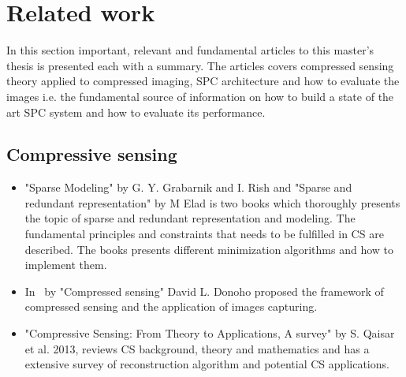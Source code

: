 \section{Related work}
\label{sec:related_work}
In this section important, relevant and fundamental articles to this master's thesis is presented each with a summary. The articles covers compressed sensing theory applied to compressed imaging, SPC architecture and how to evaluate the images i.e. the fundamental source of information on how to build a state of the art SPC system and how to evaluate its performance. 

\subsection{Compressive sensing}
\begin{itemize}


\item \cite{book:sm, book:srr} "Sparse Modeling" by G. Y. Grabarnik and  I. Rish and "Sparse and redundant representation" by M Elad is two books which thoroughly presents the topic of sparse and redundant representation and modeling. The fundamental principles and constraints that needs to be fulfilled in CS are described. The books presents different minimization algorithms and how to implement them.   

\item In~\cite{article:CS_donoho1} by "Compressed sensing" David L. Donoho proposed the framework of compressed sensing and the application of images capturing.

\item \cite{article:CS_from_theory_a_sur} "Compressive Sensing: From Theory to Applications, A survey" by S. Qaisar et al. 2013, reviews CS background, theory and mathematics and has a extensive survey of reconstruction algorithm and potential CS applications.

\end{itemize}
